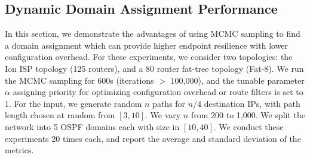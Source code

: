 \begin{figure}[!t]
	\centering
\end{figure}

\subsection{Dynamic Domain Assignment Performance} \label{sec:mcmceval}
In this section, we demonstrate the advantages of using MCMC sampling
to find a domain assignment which can provide higher endpoint
resilience with lower configuration overhead. For these experiments,
we consider two topologies: the Ion ISP topology (125 routers), and a
80 router fat-tree topology (Fat-8). We run the MCMC sampling for 600s
(iterations $>$ 100,000), and the tunable parameter $\alpha$ assigning
priority for optimizing configuration overhead or route filters is set
to 1. For the input, we generate random $n$ paths for $n/4$
destination IPs, with path length chosen at random from $[3,10]$. 
We vary $n$ from 200 to 1,000.
We
split the network into 5 OSPF domains each with size in $[10,40]$. We
conduct these experiments 20 times each, and report the average and
standard deviation of the metrics.

